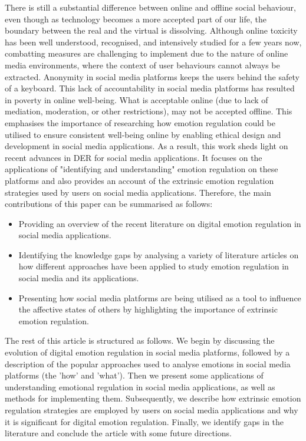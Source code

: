 \documentclass[lettersize,journal]{IEEEtran}
\begin{document}
There is still a substantial difference between online and offline social behaviour, even though as technology becomes a more accepted part of our life, the boundary between the real and the virtual is dissolving. Although online toxicity has been well understood, recognised, and intensively studied for a few years now, combatting measures are challenging to implement due to the nature of online media environments, where the context of user behaviours cannot always be extracted. Anonymity in social media platforms keeps the users behind the safety of a keyboard. This lack of accountability in social media platforms has resulted in poverty in online well-being. What is acceptable online (due to lack of mediation, moderation, or other restrictions), may not be accepted offline. This emphasises the importance of researching how emotion regulation could be utilised to ensure consistent well-being online by enabling ethical design and development in social media applications. As a result, this work sheds light on recent advances in DER for social media applications. It focuses on the applications of "identifying and understanding" emotion regulation on these platforms and also provides an account of the extrinsic emotion regulation strategies used by users on social media applications. Therefore, the main contributions of this paper can be summarised as follows:
\begin{itemize} 
    \item Providing an overview of the recent literature on digital emotion regulation in social media applications. 
    \item Identifying the knowledge gaps by analysing a variety of literature articles on how different approaches have been applied to study emotion regulation in social media and its applications.
    \item Presenting how social media platforms are being utilised as a tool to influence the affective states of others by highlighting the importance of extrinsic emotion regulation.

\end{itemize}

The rest of this article is structured as follows. We begin by discussing the evolution of digital emotion regulation in social media platforms, followed by a description of the popular approaches used to analyse emotions in social media platforms (the 'how' and 'what'). Then we present some applications of understanding emotional regulation in social media applications, as well as methods for implementing them. Subsequently, we describe how extrinsic emotion regulation strategies are employed by users on social media applications and why it is significant for digital emotion regulation. Finally, we identify gaps in the literature and conclude the article with some future directions.
\end{document}
